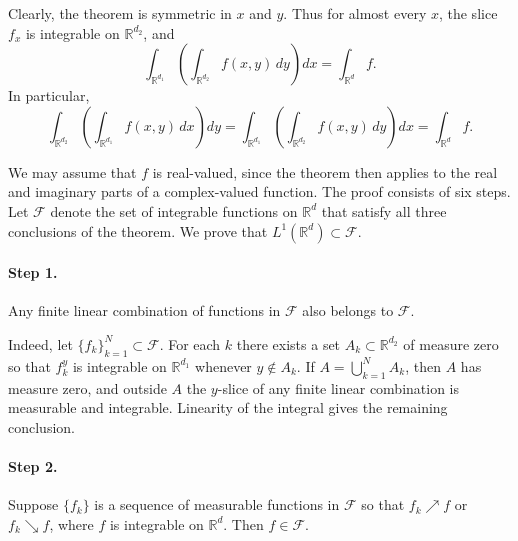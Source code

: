 \documentclass[11pt,openany]{book}
\begin{document}
Clearly, the theorem is symmetric in $x$ and $y$. Thus for almost every $x$, the slice $f_x$ is integrable on $\mathbb{R}^{d_2}$, and
\[
\int_{\mathbb{R}^{d_1}}
\left(\int_{\mathbb{R}^{d_2}}f(x,y)\,dy\right)dx
=\int_{\mathbb{R}^d}f.
\]
In particular,
\[
\int_{\mathbb{R}^{d_2}}
\left(\int_{\mathbb{R}^{d_1}}f(x,y)\,dx\right)dy
=
\int_{\mathbb{R}^{d_1}}
\left(\int_{\mathbb{R}^{d_2}}f(x,y)\,dy\right)dx
=
\int_{\mathbb{R}^d}f.
\]

We may assume that $f$ is real-valued, since the theorem then applies to the real and imaginary parts of a complex-valued function. The proof consists of six steps. Let $\mathcal{F}$ denote the set of integrable functions on $\mathbb{R}^d$ that satisfy all three conclusions of the theorem. We prove that $L^1(\mathbb{R}^d)\subset\mathcal{F}$.

\paragraph{Step 1.} Any finite linear combination of functions in $\mathcal{F}$ also belongs to $\mathcal{F}$.

Indeed, let $\{f_k\}_{k=1}^{N}\subset\mathcal{F}$. For each $k$ there exists a set $A_k\subset\mathbb{R}^{d_2}$ of measure zero so that $f_k^y$ is integrable on $\mathbb{R}^{d_1}$ whenever $y\notin A_k$. If $A=\bigcup_{k=1}^{N}A_k$, then $A$ has measure zero, and outside $A$ the $y$-slice of any finite linear combination is measurable and integrable. Linearity of the integral gives the remaining conclusion.

\paragraph{Step 2.} Suppose $\{f_k\}$ is a sequence of measurable functions in $\mathcal{F}$ so that $f_k\nearrow f$ or $f_k\searrow f$, where $f$ is integrable on $\mathbb{R}^d$. Then $f\in\mathcal{F}$.
\end{document}
